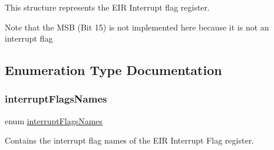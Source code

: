 This structure represents the E\+IR Interrupt flag register. 

Note that the M\+SB (Bit 15) is not implemented here because it is not an interrupt flag 

\subsection{Enumeration Type Documentation}
\mbox{\label{group__interrupts_gaf692e993b72f242633eee1b443276547}} 
\subsubsection{\texorpdfstring{interruptFlagsNames}{interruptFlagsNames}}
{\footnotesize\ttfamily enum \mbox{\hyperlink{group__interrupts_gaf692e993b72f242633eee1b443276547}{interrupt\+Flags\+Names}}}



Contains the interrupt flag names of the E\+IR Interrupt Flag register. 

